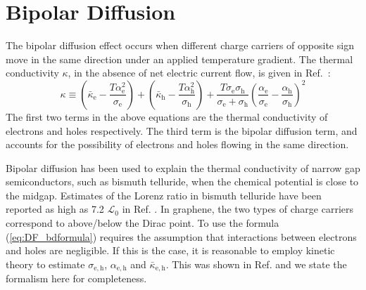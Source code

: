 \section{Bipolar Diffusion}
The bipolar diffusion effect occurs when different charge carriers of opposite sign move in the same direction under an applied temperature gradient. The thermal conductivity $\kappa$, in the absence of net electric current flow, is given in Ref.~\cite{nolas_thermal_2004}:
\begin{equation}
\kappa \equiv \left(\bar\kappa_{\mathrm{e}} - \frac{T\alpha_{\mathrm{e}}^2}{\sigma_{\mathrm{e}}}\right) + \left(\bar\kappa_{\mathrm{h}} - \frac{T\alpha_{\mathrm{h}}^2}{\sigma_{\mathrm{h}}}\right) + \frac{T\sigma_{\mathrm{e}}\sigma_{\mathrm{h}}}{\sigma_{\mathrm{e}}+\sigma_{\mathrm{h}}}\left(\frac{\alpha_{\mathrm{e}}}{\sigma_{\mathrm{e}}}-\frac{\alpha_{\mathrm{h}}}{\sigma_{\mathrm{h}}}\right)^2  \label{eq:DF_bdformula}
\end{equation}
The first two terms in the above equations are the thermal conductivity of electrons and holes respectively. The third term is the bipolar diffusion term, and accounts for the possibility of electrons and holes flowing in the same direction.

Bipolar diffusion has been used to explain the thermal conductivity of narrow gap semiconductors, such as bismuth telluride, when the chemical potential is close to the midgap. Estimates of the Lorenz ratio in bismuth telluride have been reported as high as 7.2 $\mathcal{L}_0$  in Ref. \cite{goldsmid_thermal_1956}.   In graphene, the two types of charge carriers correspond to above/below the Dirac point.  To use the formula (\ref{eq:DF_bdformula}) requires the assumption that interactions between electrons and holes are negligible. If this is the case, it is reasonable to employ kinetic theory to estimate $\sigma_{\mathrm{e,h}}$, $\alpha_{\mathrm{e,h}}$ and $\bar\kappa_{\mathrm{e,h}}$.  This was shown in Ref. \cite{yoshino_significant_2015} and we state the formalism here for completeness.


